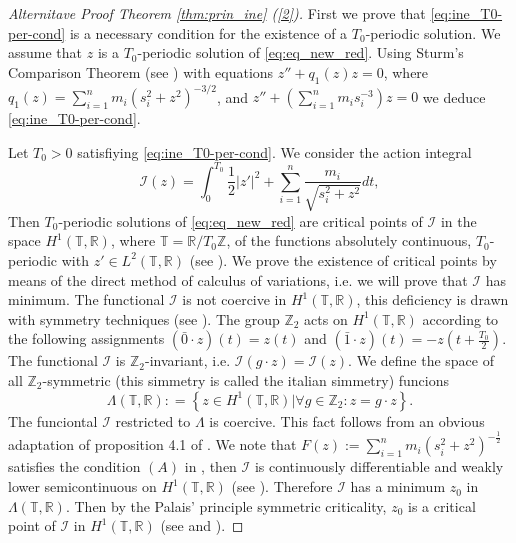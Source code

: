 \documentclass[twoside]{article}
\theoremstyle{remark}
\newcommand{\rr}{\mathbb{R}}
\begin{document}
\begin{proof}[Alternitave Proof Theorem \ref{thm:prin_ine} (\ref{2})]

First we prove that \eqref{eq:ine_T0-per-cond} is a necessary condition for the existence of a $T_0$-periodic solution. We assume that $z$ is a $T_0$-periodic solution of \eqref{eq:eq_new_red}.
Using Sturm's Comparison Theorem (see \cite{birkhoff1989ordinary}) with equations  $z''+q_1(z)z=0$, where $q_1(z)=\sum_{i=1}^{n} m_i \left(s_i^2 +z^2\right)^{-3/2}$, and $z''+\left(\sum_{i=1}^{n} m_i s_i^{-3}\right)z=0$ we deduce \eqref{eq:ine_T0-per-cond}.



Let $T_0>0$ satisfiying \eqref{eq:ine_T0-per-cond}. We consider the action integral
\[\mathcal{I}(z)=\int_0^{T_0}\frac12|z'|^2+\sum_{i=1}^n\frac{m_i}{\sqrt{s_i^2+z^2}}dt,\]
Then $T_0$-periodic solutions of \eqref{eq:eq_new_red} are critical points of $\mathcal{I}$ in the space $H^1(\mathbb{T},\rr)$, where $\mathbb{T}=\rr/T_0\mathbb{Z}$, of the functions  absolutely continuous, $T_0$-periodic with $z'\in L^2(\mathbb{T},\rr)$ (see \cite[Cor. 1.1]{Mawhin2010}). We prove the existence of critical points by means of the direct method of calculus of variations, i.e. we will prove that $\mathcal{I}$ has minimum.  The functional $\mathcal{I}$ is not coercive in $H^1(\mathbb{T},\rr)$,  this deficiency is drawn with symmetry techniques (see \cite{David-2004}). The group $\mathbb{Z}_2$ acts on $H^1(\mathbb{T},\rr)$ according to the following assignments $(\bar{0}\cdot z)(t)=z(t)$ and $(\bar{1}\cdot z)(t)=-z(t+\frac{T_0}{2})$. The functional $\mathcal{I}$ is $\mathbb{Z}_2$-invariant, i.e. $\mathcal{I}(g\cdot z)=\mathcal{I}(z)$. We define the space of all $\mathbb{Z}_2$-symmetric (this simmetry is called the italian simmetry) funcions \[\Lambda(\mathbb{T},\mathbb{R}):
=\left\{ z\in H^1(\mathbb{T},\rr) | \forall g\in \mathbb{Z}_2 : z=g\cdot z \right\}.\]
The funciontal $\mathcal{I}$ restricted to $\Lambda$  is coercive. This fact follows from an obvious adaptation of proposition 4.1 of \cite{David-2004}. We note that $F(z):=\sum_{i=1}^nm_i(s_i^2+z^2)^{-\frac{1}{2}}$ satisfies the condition $(A)$ in \cite[p. 12]{Mawhin2010}, then $\mathcal{I}$  is continuously differentiable and weakly lower semicontinuous on $H^1(\mathbb{T},\rr)$ (see \cite[p. 13]{Mawhin2010}). Therefore $\mathcal{I}$ has a minimum $z_0$ in $\Lambda(\mathbb{T},\mathbb{R})$. Then by the Palais' principle symmetric criticality,  $z_0$ is a critical point of $\mathcal{I}$ in $H^1(\mathbb{T},\rr)$ (see \cite{David-2004} and \cite{RichardPalais274}).


\end{proof}
\end{document}
